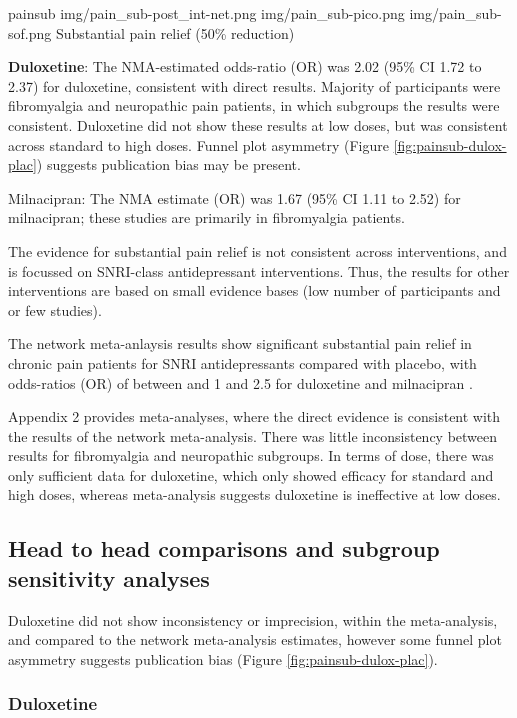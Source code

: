 \documentclass{report}\usepackage[]{graphicx}\usepackage[]{color}
\begin{document}
\soffignew
{painsub}
{img/pain_sub-post_int-net.png}
{img/pain_sub-pico.png}
{img/pain_sub-sof.png}
{Substantial pain relief (50\% reduction)}

\textbf{Duloxetine}: The NMA-estimated odds-ratio (OR) was 2.02 (95\% CI 1.72 to 2.37) for duloxetine, consistent with direct results. Majority of participants were fibromyalgia and neuropathic pain patients, in which subgroups the results were consistent. Duloxetine did not show these results at low doses, but was consistent across standard to high doses. Funnel plot asymmetry (Figure \ref{fig:painsub-dulox-plac}) suggests publication bias may be present.


Milnacipran: The NMA estimate (OR) was 1.67 (95\% CI 1.11 to 2.52) for milnacipran; these studies are primarily in fibromyalgia patients.

 The evidence for substantial pain relief is not consistent across interventions, and is focussed on SNRI-class antidepressant interventions. Thus, the results for other interventions are based on small evidence bases (low number of participants and or few studies).

The network meta-anlaysis results show significant substantial pain relief in chronic pain patients for SNRI antidepressants compared with placebo, with odds-ratios (OR) of between and 1 and 2.5 for duloxetine and milnacipran .

Appendix 2 provides meta-analyses, where the direct evidence is consistent with the results of the network meta-analysis. There was little inconsistency between results for fibromyalgia and neuropathic subgroups.  In terms of dose, there was only sufficient data for duloxetine, which only showed efficacy for standard and high doses,  whereas meta-analysis suggests duloxetine is ineffective at low doses.

\subsection{Head to head comparisons and subgroup sensitivity analyses}


Duloxetine did not show inconsistency or imprecision, within the meta-analysis, and compared to the network meta-analysis estimates, however some funnel plot asymmetry suggests publication bias (Figure \ref{fig:painsub-dulox-plac}).

\subsubsection{Duloxetine}
\end{document}
